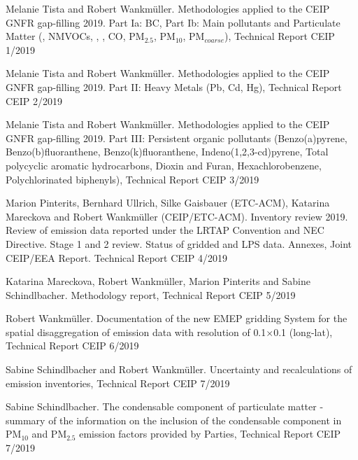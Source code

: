 \enlargethispage{\baselineskip}
\begin{list}{}{\setlength{\leftmargin}{15pt}\setlength{\itemindent}{-\leftmargin}}\small

\item[]  
  Melanie Tista and Robert Wankm\"uller.
  Methodologies applied to the CEIP GNFR gap-filling 2019. Part Ia: BC, Part Ib: Main pollutants and Particulate Matter (\nox, NMVOCs, \sox, \nhiii, CO, PM$_{2.5}$, PM$_{10}$, PM$_{coarse}$),  Technical Report CEIP 1/2019

\item[]
  Melanie Tista and Robert Wankm\"uller.
  Methodologies applied to the CEIP GNFR gap-filling 2019. Part II: Heavy Metals (Pb, Cd, Hg),  Technical Report CEIP 2/2019

\item[]
  Melanie Tista and Robert Wankm\"uller. 
Methodologies applied to the CEIP GNFR gap-filling 2019. Part III: Persistent organic pollutants (Benzo(a)pyrene, Benzo(b)fluoranthene, Benzo(k)fluoranthene, Indeno(1,2,3-cd)pyrene, Total polycyclic aromatic hydrocarbons, Dioxin and Furan, Hexachlorobenzene, Polychlorinated biphenyls), Technical Report CEIP 3/2019
  
  
\item[]
  Marion Pinterits, Bernhard Ullrich, Silke Gaisbauer  (ETC-ACM), Katarina Mareckova and Robert  Wankm\"uller (CEIP/ETC-ACM). 
  Inventory review 2019. Review of emission data reported under the LRTAP
Convention and NEC Directive.  Stage 1 and 2 review. Status of gridded
and LPS data. Annexes,  Joint CEIP/EEA Report. Technical Report CEIP 4/2019

\item[]
  Katarina Mareckova, Robert Wankm\"uller, Marion Pinterits and Sabine Schindlbacher.
  Methodology report, Technical Report CEIP 5/2019

\item[]
  Robert Wankm\"uller. 
  Documentation of the new EMEP gridding System for the spatial disaggregation of emission data with resolution of {0.1\degrees $\times$0.1\degrees}  (long-lat), Technical Report CEIP 6/2019

\item[]
Sabine Schindlbacher and Robert Wankm\"uller.  
Uncertainty and recalculations of emission inventories, Technical Report CEIP 7/2019

\item[]
Sabine Schindlbacher. The condensable component of particulate matter - summary of the information on the inclusion of the condensable component in PM$_{10}$ and PM$_{2.5}$ emission factors provided by Parties, Technical Report CEIP 7/2019
  

\end{list}


